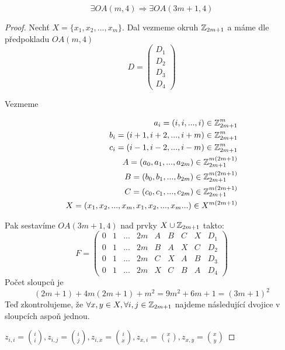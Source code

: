 
\begin{lemma}[OA 3m + 1]\label{3m_plus1}
	\[ \exists OA(m, 4) \Rightarrow \exists OA(3m + 1, 4) \]
\end{lemma}
\begin{proof}
	Nechť $X = \{ x_1, x_2, ..., x_m \}$.
	Dal vezmeme okruh $\operatorname{\mathbb{Z}}_{2m + 1}$ a máme dle předpokladu $OA(m, 4)$
	\[ D =
	\begin{pmatrix}
	D_1\\
	D_2\\
	D_3\\
	D_4
	\end{pmatrix}
	\]

	Vezmeme

	\begin{equation*}
	\begin{aligned}
		a_i = (i, i, ..., i) \in \operatorname{\mathbb{Z}}_{2m + 1}^m\\
		b_i = (i + 1, i + 2, ..., i + m) \in \operatorname{\mathbb{Z}}_{2m + 1}^m\\
		c_i = (i - 1, i - 2, ..., i - m) \in \operatorname{\mathbb{Z}}_{2m + 1}^m\\
		A = (a_0, a_1, ..., a_{2m}) \in \operatorname{\mathbb{Z}}_{2m + 1}^{m(2m + 1)}\\
		B = (b_0, b_1, ..., b_{2m}) \in \operatorname{\mathbb{Z}}_{2m + 1}^{m(2m + 1)}\\
		C = (c_0, c_1, ..., c_{2m}) \in \operatorname{\mathbb{Z}}_{2m + 1}^{m(2m + 1)}\\
		X = (x_1, x_2, ..., x_m, x_1, x_2, ..., x_m ...) \in X^{m(2m + 1)}\\
	\end{aligned}
	\end{equation*}

	Pak sestavíme $OA(3m + 1, 4)$ nad prvky $X \cup \operatorname{\mathbb{Z}}_{2m + 1}$ takto:
	\[ F =
	\begin{pmatrix}
		0 & 1 & ... & 2m & A & B & C & X & D_1\\
		0 & 1 & ... & 2m & B & A & X & C & D_2\\
		0 & 1 & ... & 2m & C & X & A & B & D_3\\
		0 & 1 & ... & 2m & X & C & B & A & D_4
	\end{pmatrix}
	\]
	Počet sloupců je
	\[ (2m+1) + 4m(2m + 1) + m^2 = 9m^2 + 6m + 1 = (3m + 1)^2 \]
	Teď zkontrolujeme, že $\forall x,y \in X, \forall i,j \in \operatorname{\mathbb{Z}}_{2m + 1}$ najdeme následující dvojice v sloupcích aspoň jednou.

	$z_{i, i} = \binom{i}{i}, z_{i, j} = \binom{i}{j}, z_{i, x} = \binom{i}{x}, z_{x, i} = \binom{x}{i}, z_{x, y} = \binom{x}{y}$


\end{proof}
